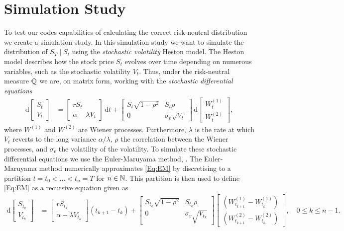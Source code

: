 \section{Simulation Study}
To test our codes capabilities of calculating the correct risk-neutral distribution we create a simulation study. In this simulation study we want to simulate the distribution of $S_T\mid S_t$ using the \emph{stochastic volatility} Heston model. The Heston model describes how the stock price $S_t$ evolves over time depending on numerous variables, such as the stochastic volatility $V_t$. Thus, under the risk-neutral measure $\mathbb{Q}$ we are, on matrix form, working with the \emph{stochastic differential equations}
\begin{align}\label{Eq:EM}
    \mathrm{d}\begin{bmatrix}S_t\\V_t\end{bmatrix} &= \begin{bmatrix}rS_t\\\alpha-\lambda V_t\end{bmatrix}\,\mathrm{d}t + \begin{bmatrix}S_t\sqrt{1-\rho^2}&S_t\rho\\0&\sigma_v\sqrt{V_t}\end{bmatrix}\,\mathrm{d}\begin{bmatrix}W^{(1)}_t\\W^{(2)}_t\end{bmatrix},
\end{align}
where $W^{(1)}$ and $W^{(2)}$ are Wiener processes. Furthermore, $\lambda$ is the rate at which $V_t$ reverts to the long variance $\alpha/\lambda$, $\rho$ the correlation between the Wiener processes, and $\sigma_v$ the volatility of the volatility. To simulate these stochastic differential equations we use the Euler-Maruyama method, \citep{Gatheral}. The Euler-Maruyama method numerically approximates \eqref{Eq:EM} by discretising to a partition $t=t_0<\dots<t_n=T$ for $n\in\mathbb{N}$. This partition is then used to define \eqref{Eq:EM} as a recursive equation given as
\begin{align*}
        \mathrm{d}\begin{bmatrix}S_{t_k}\\V_{t_k}\end{bmatrix} &= \begin{bmatrix}rS_{t_k}\\\alpha-\lambda V_{t_k}\end{bmatrix}\left(t_{k+1}-t_k\right) + \begin{bmatrix}S_{t_k}\sqrt{1-\rho^2}&S_{t_k}\rho\\0&\sigma_v\sqrt{V_{t_k}}\end{bmatrix}\begin{bmatrix}(W^{(1)}_{t_{k+1}}-W^{(1)}_{t_k})\\(W^{(2)}_{t_{k+1}}-W^{(2)}_{t_k})\end{bmatrix},\quad 0\leq k\leq n-1.
\end{align*}
